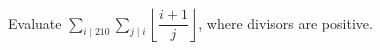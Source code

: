 Evaluate $\displaystyle\sum_{i\mid210}\sum_{j\mid i}\left\lfloor\dfrac{i+1}{j}\right\rfloor$, where divisors are positive.

